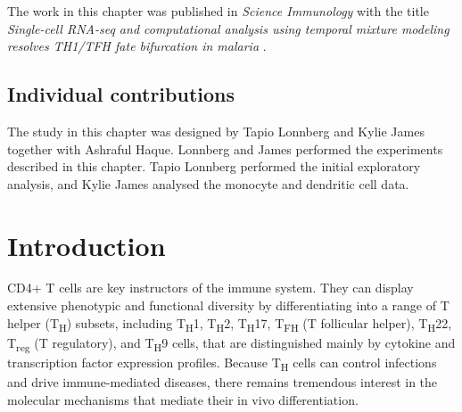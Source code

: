 The work in this chapter was published in \textit{Science Immunology} with the title \textit{Single-cell RNA-seq and computational analysis using temporal mixture modeling resolves TH1/TFH fate bifurcation in malaria} \cite{Lonnberg2017-cp}.

\subsection*{Individual contributions}

The study in this chapter was designed by Tapio Lonnberg and Kylie James together with Ashraful Haque. Lonnberg and James performed the experiments described in this chapter. Tapio Lonnberg performed the initial exploratory analysis, and Kylie James analysed the monocyte and dendritic cell data.

\section{Introduction}

CD4+ T cells are key instructors of the immune system. They can display extensive phenotypic and functional diversity by differentiating into a range of T helper (T\textsubscript{H}) subsets, including T\textsubscript{H}1, T\textsubscript{H}2, T\textsubscript{H}17, T\textsubscript{FH} (T follicular helper), T\textsubscript{H}22, T\textsubscript{reg} (T regulatory), and T\textsubscript{H}9 cells, that are distinguished mainly by cytokine and transcription factor expression profiles. Because T\textsubscript{H} cells can control infections and drive immune-mediated diseases, there remains tremendous interest in the molecular mechanisms that mediate their in vivo differentiation.

